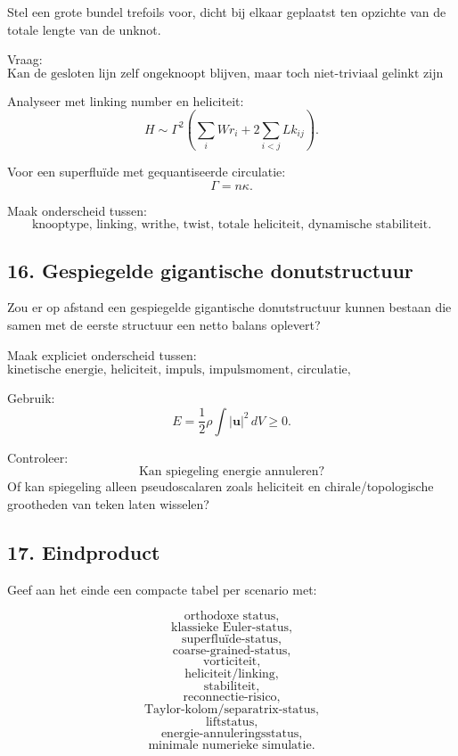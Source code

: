 \documentclass[11pt]{article}
\begin{document}
        Stel een grote bundel trefoils voor, dicht bij elkaar geplaatst ten opzichte van de totale lengte van de unknot.
        
        Vraag:
        \[
            \text{Kan de gesloten lijn zelf ongeknoopt blijven, maar toch niet-triviaal gelinkt zijn met veel trefoils?}
        \]
        
        Analyseer met linking number en heliciteit:
        \[
            H
            \sim
            \Gamma^2
            \left(
                \sum_i Wr_i
            +
            2\sum_{i<j}Lk_{ij}
            \right).
        \]
        
        Voor een superfluïde met gequantiseerde circulatie:
        \[
            \Gamma=n\kappa.
        \]
        
        Maak onderscheid tussen:
        \[
            \text{knooptype, linking, writhe, twist, totale heliciteit, dynamische stabiliteit.}
        \]
    
    \subsection{16. Gespiegelde gigantische donutstructuur}
        
        Zou er op afstand een gespiegelde gigantische donutstructuur kunnen bestaan die samen met de eerste structuur een netto balans oplevert?
        
        Maak expliciet onderscheid tussen:
        \[
            \text{kinetische energie, heliciteit, impuls, impulsmoment, circulatie, chirale/topologische lading.}
        \]
        
        Gebruik:
        \[
            E
            =
            \frac{1}{2}\rho\int |\mathbf{u}|^2\,dV
            \geq0.
        \]
        
        Controleer:
        \[
            \text{Kan spiegeling energie annuleren?}
        \]
        Of kan spiegeling alleen pseudoscalaren zoals heliciteit en chirale/topologische grootheden van teken laten wisselen?
    
    \subsection{17. Eindproduct}
        
        Geef aan het einde een compacte tabel per scenario met:
        
        \[
            \text{orthodoxe status,}
        \]
        \[
            \text{klassieke Euler-status,}
        \]
        \[
            \text{superfluïde-status,}
        \]
        \[
            \text{coarse-grained-status,}
        \]
        \[
            \text{vorticiteit,}
        \]
        \[
            \text{heliciteit/linking,}
        \]
        \[
            \text{stabiliteit,}
        \]
        \[
            \text{reconnectie-risico,}
        \]
        \[
            \text{Taylor-kolom/separatrix-status,}
        \]
        \[
            \text{liftstatus,}
        \]
        \[
            \text{energie-annuleringsstatus,}
        \]
        \[
            \text{minimale numerieke simulatie.}
        \]
        
\end{document}
